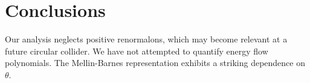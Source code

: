 \section{Conclusions}\label{sec:conclusions}

Our analysis neglects positive renormalons, which may become relevant at
a future circular collider. We have not attempted to quantify energy
flow polynomials. The Mellin-Barnes representation exhibits a striking
dependence on $\theta$.

